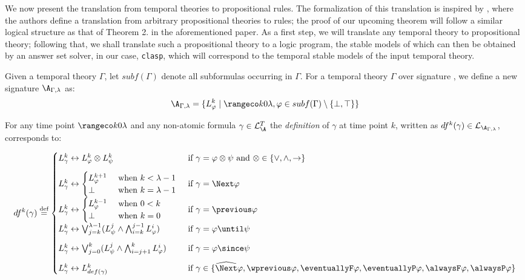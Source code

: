 We now present the translation from temporal theories to propositional
rules. The formalization of this translation is inspired by
\cite[p. 9]{capeva05a}, where the authors define a translation from
arbitrary propositional theories to rules; the proof of our upcoming
theorem will follow a similar logical structure as that of Theorem
2. in the aforementioned paper. As a first step, we will translate any
temporal theory to propositional theory; following that, we shall
translate such a propositional theory to a logic program, the stable
models of which can then be obtained by an answer set solver, in our
case, \verb|clasp|, which will correspond to the temporal stable
models of the input temporal theory.

Given a temporal theory $\Gamma$, let $subf(\Gamma)$ denote all
subformulas occurring in $\Gamma$. For a temporal theory $\Gamma$ over
signature \A, we define a new signature $\A_{\Gamma,\lambda}$ as:
$$
\A_{\Gamma,\lambda} = \{ L_{\varphi}^k \mid \kinlambda, \varphi \in subf(\Gamma)
\setminus \{ \bot, \top \} \}
$$

For any time point $\kinlambda$ and any non-atomic formula $\gamma \in \mathcal{L}_\A^T$ the \emph{definition} of $\gamma$ at time point $k$, written as $df^k(\gamma) \in \mathcal{L}_{\A_{\Gamma,\lambda}}$, corresponds to:

\begin{align*}
df^k(\gamma) \defeq \begin{cases}
  L^k_{\gamma} \leftrightarrow L_{\varphi}^k \otimes L_{\psi}^k 
  &\text{ if } \gamma = \varphi \otimes \psi \text{ and } \otimes \in \{ \vee, \wedge, \rightarrow \}\\[2ex]
  L^k_\gamma \leftrightarrow \begin{cases} 
    L^{k+1}_{\varphi} &\text{ when } k < \lambda - 1\\
    \bot &\text{ when } k = \lambda - 1
    \end{cases}
  &\text{ if } \gamma = \Next \varphi \\[2ex]
  L^k_{\gamma} \leftrightarrow \begin{cases} 
    L^{k-1}_{\varphi} &\text{ when } 0 < k\\
    \bot &\text{ when } k = 0
    \end{cases}
  &\text{ if } \gamma = \previous \varphi \\[2ex]
  L^k_{\gamma} \leftrightarrow \bigvee_{j=k}^{\lambda-1}(L_\psi^j \wedge \bigwedge_{i=k}^{j-1}L_{\varphi}^i)
  &\text{ if } \gamma = \varphi \until \psi \\[2ex]
  L^k_{\gamma} \leftrightarrow \bigvee_{j=0}^{k}(L_\psi^j \wedge \bigwedge_{i=j+1}^{k}L_{\varphi}^i)
  &\text{ if } \gamma = \varphi \since \psi \\[2ex]
  L^k_{\gamma} \leftrightarrow L^k_{def(\gamma)}
  &\text{ if } \gamma \in \{ \wnext\varphi, \wprevious\varphi, \eventuallyF\varphi, \eventuallyP\varphi, \alwaysF\varphi, \alwaysP\varphi \}
\end{cases}
\end{align*}

